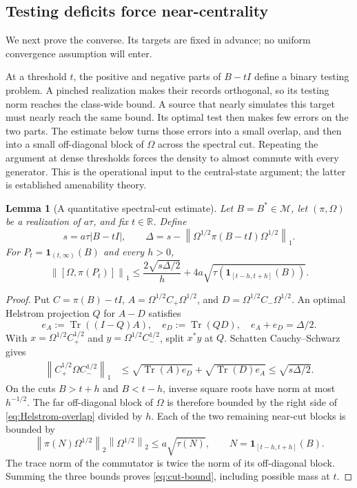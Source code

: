 \documentclass[11pt,reqno]{amsart}
\newtheorem{lemma}[theorem]{Lemma}
\theoremstyle{definition}
\theoremstyle{remark}
\numberwithin{equation}{section}
\DeclareMathOperator{\Tr}{Tr}
\newcommand{\M}{\mathcal M}
\newcommand{\one}{\mathbf 1}
\newcommand{\norm}[1]{\left\lVert#1\right\rVert}
\begin{document}
\subsection{Testing deficits force near-centrality}

We next prove the converse. Its targets are fixed in advance; no uniform convergence assumption will enter.

At a threshold $t$, the positive and negative parts of $B-tI$ define a binary testing problem. A pinched realization makes their records orthogonal, so its testing norm reaches the class-wide bound. A source that nearly simulates this target must nearly reach the same bound. Its optimal test then makes few errors on the two parts. The estimate below turns those errors into a small overlap, and then into a small off-diagonal block of $\Omega$ across the spectral cut. Repeating the argument at dense thresholds forces the density to almost commute with every generator. This is the operational input to the central-state argument; the latter is established amenability theory.

\begin{lemma}[A quantitative spectral-cut estimate]\label{lem:cut-estimate}
Let $B=B^*\in\M$, let $(\pi,\Omega)$ be a realization of $a\tau$, and fix $t\in\mathbb R$. Define
\[
 s=a\tau|B-tI|,\qquad
 \Delta=s-\norm{\Omega^{1/2}\pi(B-tI)\Omega^{1/2}}_1.
\]
For $P_t=\one_{(t,\infty)}(B)$ and every $h>0$,
\begin{equation}\label{eq:cut-bound}
 \norm{[\Omega,\pi(P_t)]}_1
 \le\frac{2\sqrt{s\Delta/2}}h
       +4a\sqrt{\tau(\one_{[t-h,t+h]}(B))}.
\end{equation}
\end{lemma}

\begin{proof}
Put $C=\pi(B)-tI$, $A=\Omega^{1/2}C_+\Omega^{1/2}$, and $D=\Omega^{1/2}C_-\Omega^{1/2}$. An optimal Helstrom projection $Q$ for $A-D$ satisfies
\[
 e_A:=\Tr((I-Q)A),\quad e_D:=\Tr(QD),\quad e_A+e_D=\Delta/2.
\]
With $x=\Omega^{1/2}C_+^{1/2}$ and $y=\Omega^{1/2}C_-^{1/2}$, split $x^*y$ at $Q$. Schatten Cauchy--Schwarz gives
\begin{align}
 \norm{C_+^{1/2}\Omega C_-^{1/2}}_1
 &\le\sqrt{\Tr(A)e_D}+\sqrt{\Tr(D)e_A}
 \le\sqrt{s\Delta/2}.\label{eq:Helstrom-overlap}
\end{align}
On the cuts $B>t+h$ and $B<t-h$, inverse square roots have norm at most $h^{-1/2}$. The far off-diagonal block of $\Omega$ is therefore bounded by the right side of \eqref{eq:Helstrom-overlap} divided by $h$. Each of the two remaining near-cut blocks is bounded by
\[
 \norm{\pi(N)\Omega^{1/2}}_2\norm{\Omega^{1/2}}_2
 \le a\sqrt{\tau(N)},\qquad N=\one_{[t-h,t+h]}(B).
\]
The trace norm of the commutator is twice the norm of its off-diagonal block. Summing the three bounds proves \eqref{eq:cut-bound}, including possible mass at $t$.
\end{proof}
\end{document}
